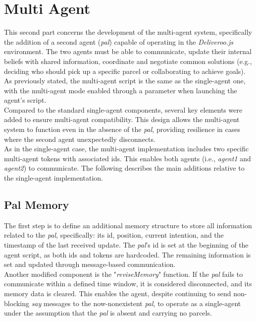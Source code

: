 \section{Multi Agent}
    This second part concerns the development of the multi-agent system, specifically the addition of a second agent (\textit{pal}) capable of operating in the \textit{Deliveroo.js} environment. The two agents must be able to communicate, update their internal beliefs with shared information, coordinate and negotiate common solutions (e.g., deciding who should pick up a specific parcel or collaborating to achieve goals).
    \medskip\\ 
    As previously stated, the multi-agent script is the same as the single-agent one, with the multi-agent mode enabled through a parameter when launching the agent's script.
    \medskip\\
    Compared to the standard single-agent components, several key elements were added to ensure multi-agent compatibility. This design allows the multi-agent system to function even in the absence of the \textit{pal}, providing resilience in cases where the second agent unexpectedly disconnects.
    \medskip\\
    As in the single-agent case, the multi-agent implementation includes two specific multi-agent tokens with associated ids. This enables both agents (i.e., \textit{agent1} and \textit{agent2}) to communicate. The following describes the main additions relative to the single-agent implementation.

    \subsection{Pal Memory}
        The first step is to define an additional memory structure to store all information related to the \textit{pal}, specifically: its id, position, current intention, and the timestamp of the last received update. The \textit{pal}'s id is set at the beginning of the agent script, as both ids and tokens are hardcoded. The remaining information is set and updated through message-based communication.
        \medskip\\
        Another modified component is the "\textit{reviseMemory}" function. If the \textit{pal} fails to communicate within a defined time window, it is considered disconnected, and its memory data is cleared. This enables the agent, despite continuing to send non-blocking \textit{say} messages to the now-nonexistent \textit{pal}, to operate as a single-agent under the assumption that the \textit{pal} is absent and carrying no parcels.

